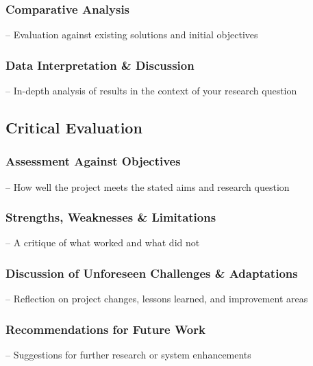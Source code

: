 \subsubsection{Comparative Analysis}
– Evaluation against existing solutions and initial objectives
\subsubsection{Data Interpretation \& Discussion}
– In-depth analysis of results in the context of your research question
\subsection{Critical Evaluation}
\subsubsection{Assessment Against Objectives}
– How well the project meets the stated aims and research question
\subsubsection{Strengths, Weaknesses \& Limitations}
– A critique of what worked and what did not
\subsubsection{Discussion of Unforeseen Challenges \& Adaptations}
– Reflection on project changes, lessons learned, and improvement areas
\subsubsection{Recommendations for Future Work}
– Suggestions for further research or system enhancements
